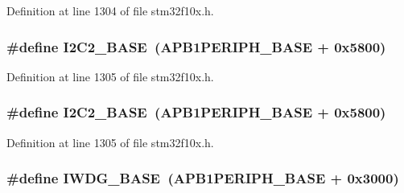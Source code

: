 Definition at line 1304 of file stm32f10x.\+h.

\subsubsection[{\texorpdfstring{I2\+C2\+\_\+\+B\+A\+SE}{I2C2_BASE}}]{\setlength{\rightskip}{0pt plus 5cm}\#define I2\+C2\+\_\+\+B\+A\+SE~({\bf A\+P\+B1\+P\+E\+R\+I\+P\+H\+\_\+\+B\+A\+SE} + 0x5800)}\hypertarget{group___peripheral__memory__map_ga04bda70f25c795fb79f163b633ad4a5d}{}\label{group___peripheral__memory__map_ga04bda70f25c795fb79f163b633ad4a5d}


Definition at line 1305 of file stm32f10x.\+h.

\subsubsection[{\texorpdfstring{I2\+C2\+\_\+\+B\+A\+SE}{I2C2_BASE}}]{\setlength{\rightskip}{0pt plus 5cm}\#define I2\+C2\+\_\+\+B\+A\+SE~({\bf A\+P\+B1\+P\+E\+R\+I\+P\+H\+\_\+\+B\+A\+SE} + 0x5800)}\hypertarget{group___peripheral__memory__map_ga04bda70f25c795fb79f163b633ad4a5d}{}\label{group___peripheral__memory__map_ga04bda70f25c795fb79f163b633ad4a5d}


Definition at line 1305 of file stm32f10x.\+h.

\subsubsection[{\texorpdfstring{I\+W\+D\+G\+\_\+\+B\+A\+SE}{IWDG_BASE}}]{\setlength{\rightskip}{0pt plus 5cm}\#define I\+W\+D\+G\+\_\+\+B\+A\+SE~({\bf A\+P\+B1\+P\+E\+R\+I\+P\+H\+\_\+\+B\+A\+SE} + 0x3000)}\hypertarget{group___peripheral__memory__map_ga8543ee4997296af5536b007cd4748f55}{}\label{group___peripheral__memory__map_ga8543ee4997296af5536b007cd4748f55}


